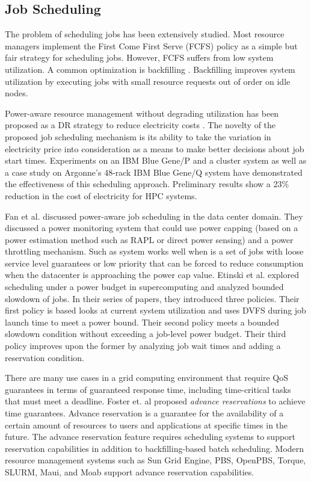 \subsection{Job Scheduling}
The problem of scheduling jobs has been extensively studied. Most resource managers implement the First Come First Serve (FCFS) policy
as a simple but fair strategy for scheduling jobs. However, FCFS suffers from low system utilization. A common optimization is backfilling
\cite{lifka_anl/ibm_1995,mualem_utilization_2001,feitelson_parallel_2004}. Backfilling improves system utilization by executing jobs with small resource requests out of order on idle nodes.

Power-aware resource management without degrading utilization has been proposed as a DR strategy to reduce electricity costs \cite{yang_integrating_2013,zhou_reducing_2013}. The novelty of the proposed job scheduling mechanism is its ability to take the variation in electricity price into consideration as a means to make better decisions about job start times. Experiments on an IBM Blue Gene/P and a cluster system as well as a case study on Argonne's 48-rack IBM Blue Gene/Q system have demonstrated the effectiveness of this scheduling approach. Preliminary results show a 23\% reduction in the cost of electricity for HPC systems.

Fan et al. \cite{PowerAwareServer1} discussed power-aware job scheduling in the data center domain. 
They discussed a power monitoring system that could use power capping (based on a power estimation method such as RAPL or direct power sensing) and a power throttling mechanism. Such as system works well when is a set of jobs with loose service level guarantees or low priority that can be
forced to reduce consumption when the datacenter is approaching the power cap value. Etinski et al. \cite{Etinski1,Etinski2,Etinski3,Etinski4} explored scheduling under a power budget in supercomputing and analyzed bounded slowdown of jobs. In their series of papers, they introduced three policies. Their first policy is based looks at current system utilization and uses DVFS during job launch time to meet a power bound. Their second policy meets a bounded slowdown condition without exceeding a job-level power budget. Their third policy improves upon the former by analyzing job wait times and adding a reservation condition. 

There are many use cases in a grid computing environment that require QoS
guarantees in terms of guaranteed response time, including time-critical
tasks that must meet a deadline. Foster et. al \cite{foster_distributed_1999,foster_anatomy_2001} proposed \emph{advance reservations} to achieve time guarantees. Advance reservation is a guarantee for the availability of a certain amount of resources to users and applications at specific times in the future. The advance reservation feature requires scheduling systems to support reservation capabilities in addition to backfilling-based batch scheduling. Modern resource management systems such as Sun Grid Engine, PBS, OpenPBS, Torque, SLURM, Maui, and Moab support advance reservation capabilities.

